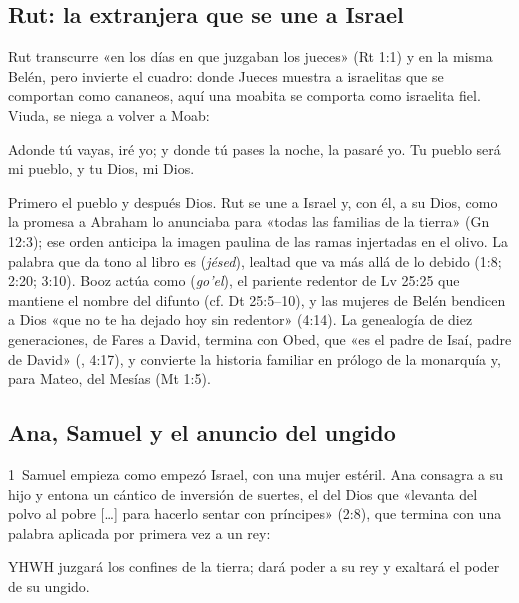 \subsection{Rut: la extranjera que se une a Israel}
Rut transcurre «en los días en que juzgaban los jueces» (Rt 1:1) y en la misma Belén, pero invierte el cuadro: donde Jueces muestra a israelitas que se comportan como cananeos, aquí una moabita se comporta como israelita fiel. Viuda, se niega a volver a Moab:

\begin{cita}Adonde tú vayas, iré yo; y donde tú pases la noche, la pasaré yo. Tu pueblo será mi pueblo, y tu Dios, mi Dios.\end{cita}

Primero el pueblo y después Dios. Rut se une a Israel y, con él, a su Dios, como la promesa a Abraham lo anunciaba para «todas las familias de la tierra» (Gn 12:3); ese orden anticipa la imagen paulina de las ramas injertadas en el olivo. La palabra que da tono al libro es  (\emph{jésed}), lealtad que va más allá de lo debido (1:8; 2:20; 3:10). Booz actúa como  (\emph{go'el}), el pariente redentor de Lv 25:25 que mantiene el nombre del difunto (cf. Dt 25:5--10), y las mujeres de Belén bendicen a Dios «que no te ha dejado hoy sin redentor» (4:14). La genealogía de diez generaciones, de Fares a David, termina con Obed, que «es el padre de Isaí, padre de David» (, 4:17), y convierte la historia familiar en prólogo de la monarquía y, para Mateo, del Mesías (Mt 1:5).

\subsection{Ana, Samuel y el anuncio del ungido}
1~Samuel empieza como empezó Israel, con una mujer estéril. Ana consagra a su hijo y entona un cántico de inversión de suertes, el del Dios que «levanta del polvo al pobre [\ldots] para hacerlo sentar con príncipes» (2:8), que termina con una palabra aplicada por primera vez a un rey:

\begin{cita}YHWH juzgará los confines de la tierra; dará poder a su rey y exaltará el poder de su ungido.\end{cita}


